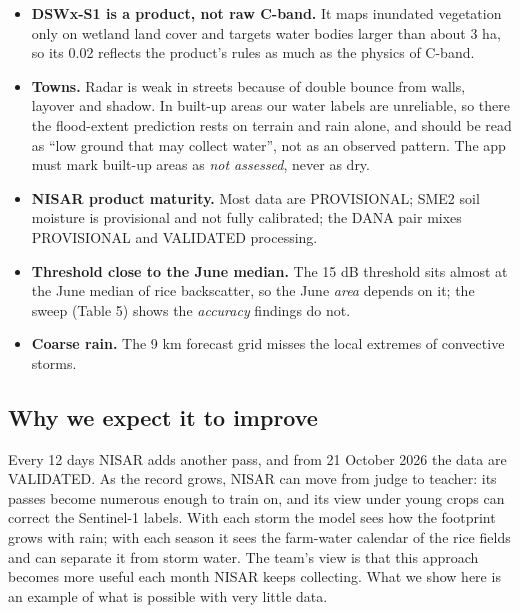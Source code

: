 \documentclass[10pt,twocolumn]{article}
\begin{document}
\begin{itemize}
\item{} \textbf{DSWx-S1 is a product, not raw C-band.} It maps inundated vegetation only on wetland land cover and targets water bodies larger than about 3 ha, so its 0.02 reflects the product's rules as much as the physics of C-band.
\item{} \textbf{Towns.} Radar is weak in streets because of double bounce from walls, layover and shadow. In built-up areas our water labels are unreliable, so there the flood-extent prediction rests on terrain and rain alone, and should be read as ``low ground that may collect water'', not as an observed pattern. The app must mark built-up areas as \emph{not assessed}, never as dry.
\item{} \textbf{NISAR product maturity.} Most data are PROVISIONAL; SME2 soil moisture is provisional and not fully calibrated; the DANA pair mixes PROVISIONAL and VALIDATED processing.
\item{} \textbf{Threshold close to the June median.} The \textminus{}15 dB threshold sits almost at the June median of rice backscatter, so the June \emph{area} depends on it; the sweep (Table 5) shows the \emph{accuracy} findings do not.
\item{} \textbf{Coarse rain.} The 9 km forecast grid misses the local extremes of convective storms.
\end{itemize}
\subsection{Why we expect it to improve}
Every 12 days NISAR adds another pass, and from 21 October 2026 the data are VALIDATED. As the record grows, NISAR can move from judge to teacher: its passes become numerous enough to train on, and its view under young crops can correct the Sentinel-1 labels. With each storm the model sees how the footprint grows with rain; with each season it sees the farm-water calendar of the rice fields and can separate it from storm water. The team's view is that this approach becomes more useful each month NISAR keeps collecting. What we show here is an example of what is possible with very little data.
\end{document}
